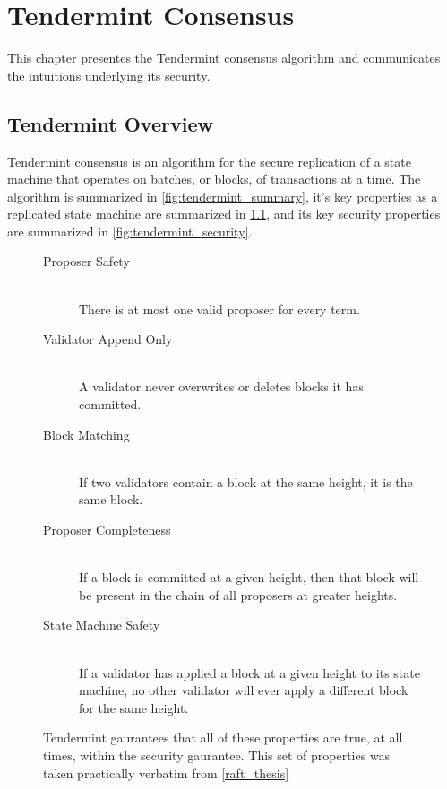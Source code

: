 \chapter{Tendermint Consensus}

This chapter presentes the Tendermint consensus algorithm and communicates the intuitions underlying its security.

\section{Tendermint Overview}

Tendermint consensus is an algorithm for the secure replication of a state machine that operates on batches, or blocks, of transactions at a time.
The algorithm is summarized in \ref{fig:tendermint_summary}, it's key properties as a replicated state machine are summarized in \ref{fig:tendermint_gaurantees}, and its key security properties are summarized in \ref{fig:tendermint_security}.

\begin{figure}[]
	\begin{description}
	  \item[Proposer Safety] \hfill \\
		There is at most one valid proposer for every term.
	  \item[Validator Append Only] \hfill \\
		A validator never overwrites or deletes blocks it has committed.
	  \item[Block Matching] \hfill \\
		If two validators contain a block at the same height, it is the same block.
	  \item[Proposer Completeness] \hfill \\
		If a block is committed at a given height, then that block will be present in the chain of all proposers at greater heights.
	  \item[State Machine Safety] \hfill \\
		If a validator has applied a block at a given height to its state machine, no other validator will ever apply a different block for the same height.
	\end{description}
	\label{fig:tendermint_gaurantees}
  \caption{Tendermint gaurantees that all of these properties are true, at all times, within the security gaurantee. This set of properties was taken practically verbatim from \ref{raft_thesis}}
\end{figure}

